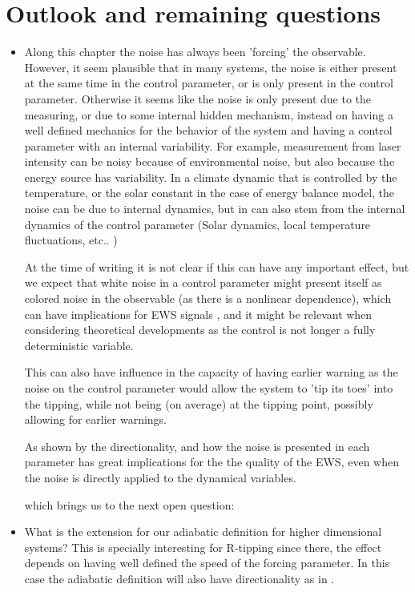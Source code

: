 \section{Outlook and remaining questions}

\begin{itemize}
	\item Along this chapter the noise has always been 'forcing' the observable. However, it seem plausible that in many systems, the noise is either present at the same time in the control parameter, or is only present in the control parameter. 
	Otherwise it seems like the noise is only present due to the measuring, or due to some internal hidden mechanism, instead on having a well defined mechanics for the behavior of the system and having a control parameter with an internal variability. 
	For example, measurement from laser intensity can be noisy because of environmental noise, but also because the energy source has variability. 
	In a climate dynamic that is controlled by the temperature, or the solar constant in the case of energy balance model, the noise can be due to internal dynamics, but in can also stem from the internal dynamics of the control parameter (Solar dynamics, local temperature fluctuations, etc.. )
	
	At the time of writing it is not clear if this can have any important effect, but we expect that white noise in a control parameter might present itself as colored noise in the observable (as there is a nonlinear dependence), which can have implications for EWS signals \citep{Dutta2018,Bury2020}, and it might be relevant when considering theoretical developments as the control is not longer a fully deterministic variable. 
	
	This can also have influence in the capacity of having earlier warning as the noise on the control parameter would allow the system to 'tip its toes' into the tipping, while not being (on average) at the tipping point, possibly allowing for earlier warnings.
	
	As shown by \cite{Patterson2021} the directionality, and how the noise is presented in each parameter has great implications for the  the quality of the EWS, even when the noise is directly applied to the dynamical variables.
	
	which brings us to the next open question:
	
	\item What is the extension for our adiabatic definition for higher dimensional systems? This is specially interesting for R-tipping since there, the effect depends on having well defined the speed of the forcing parameter. 
	In this case the adiabatic definition will also have directionality as in \cite{Patterson2021}.
	

\end{itemize}
